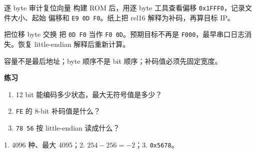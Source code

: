 
\begin{experimentbox}{逐 byte 审计复位向量}
构建 ROM 后，用逐 byte 工具查看偏移 \texttt{0x1FFF0}，记录文件大小、起始
偏移和 \texttt{E9 0D F0}。纸上把 rel16 解释为补码，再算目标 IP。
\end{experimentbox}

\begin{faultinjectionbox}{把位移 byte 交换}
把 \texttt{0D F0} 当作 \texttt{F0 0D}。预期目标不再是
\texttt{F000}，最早串口日志消失。恢复 little-endian 解释后重新计算。
\end{faultinjectionbox}

\begin{pitfallbox}
容量不是最后地址；byte 顺序不是 bit 顺序；补码值必须先固定宽度。
\end{pitfallbox}

\textbf{练习}
\begin{enumerate}[leftmargin=2.2em]
  \item 12 bit 能编码多少状态，最大无符号值是多少？
  \item \texttt{FE} 的 8-bit 补码值是什么？
  \item \texttt{78 56} 按 little-endian 读成什么？
\end{enumerate}
\begin{answerbox}
1. \(4096\) 种、最大 4095；2. \(254-256=-2\)；3. \texttt{0x5678}。
\end{answerbox}
